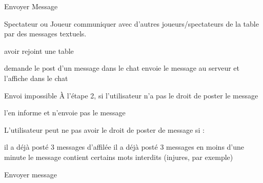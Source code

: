 \begin{usecase}{ Envoyer Message}
	
	\begin{presentation}
		\actor Spectateur ou Joueur
		\goal communiquer avec d'autres joueurs/spectateurs de la table par des 
		      messages textuels.
		
		\begin{precondition}
			\condition avoir rejoint une table
		\end{precondition}
		
		\begin{postcondition}
			\aucune
		\end{postcondition}
		
		\begin{includeuc}
			\aucun
		\end{includeuc}
	\end{presentation}
	
	\begin{scenario}
		\start demande le post d'un message dans le chat
			\system envoie le message au serveur et l'affiche dans le chat
	\end{scenario}
	
	\begin{alternative}
		\nomalt Envoi impossible
			\condition À l'étape 2, si l'utilisateur n'a pas le droit de poster 
			           le message
			
			\begin{alt}
				\system l'en informe et n'envoie pas le message
			\end{alt}
	\end{alternative}
	
	\begin{regles}
		\nom L'utilisateur peut ne pas avoir le droit de poster de message si :
		
		\begin{enumerate}
			\regle il a déjà posté 3 messages d'affilée
			\regle il a déjà posté 3 messages en moins d'une minute
			\regle le message contient certains mots interdits (injures, par exemple)
		\end{enumerate}
	\end{regles}
	
	                {Envoyer message}
		
\end{usecase}


